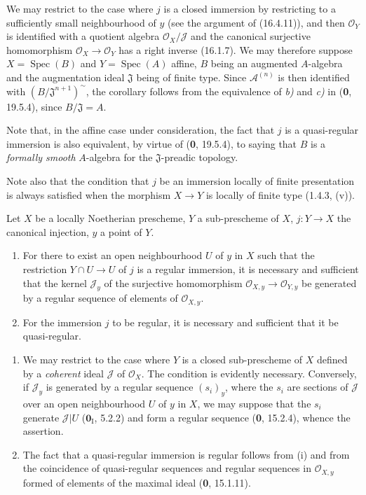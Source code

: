 We may restrict to the case where $j$ is a closed immersion by restricting
to a sufficiently small neighbourhood of $y$ (see the argument of (16.4.11)),
and then $\mathcal{O}_Y$ is identified with a quotient algebra
$\mathcal{O}_X/\mathscr{J}$ and the canonical surjective homomorphism
$\mathcal{O}_X\to\mathcal{O}_Y$ has a
right inverse (16.1.7). We may therefore suppose
$X=\operatorname{Spec}(B)$ and $Y=\operatorname{Spec}(A)$ affine, $B$ being
an augmented $A$-algebra and the augmentation ideal $\mathfrak{J}$ being of
finite type. Since $\mathscr{A}^{(n)}$ is then identified with
$(B/\mathfrak{J}^{n+1})^{\sim}$, the corollary follows from the equivalence
of \emph{b)} and \emph{c)} in (\textbf{0}, 19.5.4), since $B/\mathfrak{J}=A$.

Note that, in the affine case under consideration, the fact that $j$ is a
quasi-regular immersion is also equivalent, by virtue of (\textbf{0}, 19.5.4), to
saying that $B$ is a \emph{formally smooth} $A$-algebra for the
$\mathfrak{J}$-preadic topology.

Note also that the condition that $j$ be an immersion locally of finite
presentation is always satisfied when the morphism $X\to Y$ is locally of
finite type (1.4.3, (v)).

\begin{proposition}[16.9.10]\label{IV.16.9.10}
Let $X$ be a locally Noetherian prescheme, $Y$ a sub-prescheme of $X$,
$j:Y\to X$ the canonical injection, $y$ a point of $Y$.
\begin{enumerate}
  \item[\textup{(i)}] For there to exist an open neighbourhood $U$ of $y$ in $X$ such
  that the restriction $Y\cap U\to U$ of $j$ is a regular immersion, it is
  necessary and sufficient that the kernel $\mathscr{J}_y$ of the surjective
  homomorphism $\mathcal{O}_{X,y}\to\mathcal{O}_{Y,y}$ be generated by a
  regular sequence of elements of $\mathcal{O}_{X,y}$.
  \item[\textup{(ii)}] For the immersion $j$ to be regular, it is necessary and
  sufficient that it be quasi-regular.
\end{enumerate}
\end{proposition}

\begin{enumerate}
  \item[(i)] We may restrict to the case where $Y$ is a closed sub-prescheme
  of $X$ defined by a \emph{coherent} ideal $\mathscr{J}$ of $\mathcal{O}_X$.
  The condition is evidently necessary. Conversely, if $\mathscr{J}_y$
  is generated by a regular sequence $(s_i)_y$, where the $s_i$ are
  sections of $\mathscr{J}$ over an open neighbourhood $U$ of $y$ in
  $X$, we may suppose that the $s_i$ generate $\mathscr{J}|U$
  ($\mathbf{0}_{\mathrm I}$, 5.2.2) and form a regular sequence (\textbf{0}, 15.2.4),
  whence the assertion.
  \item[(ii)] The fact that a quasi-regular immersion is regular follows
  from (i) and from the coincidence of quasi-regular sequences and regular
  sequences in $\mathcal{O}_{X,y}$ formed of elements of the maximal ideal
  (\textbf{0}, 15.1.11).
\end{enumerate}

